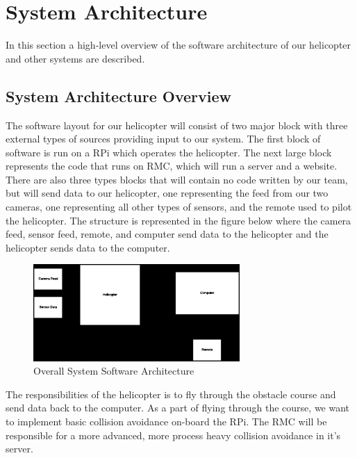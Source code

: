 \documentclass[onecolumn, oneside, letterpaper, draftclsnofoot, 10pt, compsoc]{IEEEtran}
\begin{document}
\section{System Architecture}

In this section a high-level overview of the software architecture of our helicopter and other systems are described.
\subsection{System Architecture Overview}

The software layout for our helicopter will consist of two major block with three external types of sources providing input to our system. The first block of software is run on a RPi which operates the helicopter. The next large block represents the code that runs on RMC, which will run a server and a website. There are also three types blocks that will contain no code written by our team, but will send data to our helicopter, one representing the feed from our two cameras, one representing all other types of sensors, and the remote used to pilot the helicopter. The structure is represented in the figure below where the camera feed, sensor feed, remote, and computer send data to the helicopter and the helicopter sends data to the computer.

\begin{figure}[h]
    \centering
    \includegraphics[width=0.7\textwidth]{graphics/high_level_overall_arch.eps}
    \caption{Overall System Software Architecture}
    \label{fig:OverallSystemArchitecture}
\end{figure}

The responsibilities of the helicopter is to fly through the obstacle course and send data back to the computer. As a part of flying through the course, we want to implement basic collision avoidance on-board the RPi. The RMC will be responsible for a more advanced, more process heavy collision avoidance in it's server.
\end{document}
